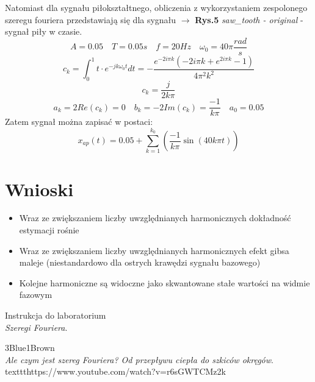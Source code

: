 \documentclass[13pt]{article}
\begin{document}
Natomiast dla sygnału piłokształtnego, obliczenia z wykorzystaniem zespolonego szeregu fouriera przedstawiają się dla sygnału $\rightarrow$ \textbf{Rys.5} \textit{saw\_tooth - original} - sygnał piły w czasie.
$$A=0.05 \quad T=0.05s \quad f=20Hz \quad \omega_0=40 \pi \frac{rad}{s}$$
$$c_k = \int_{0}^{1} t \cdot e^{-jk \omega_0 t}dt = - \frac{e^{-2i \pi k}(-2i \pi k + e^{2i \pi k} - 1)}{4 \pi^2 k^2}$$
$$c_k = \frac{j}{2k \pi}$$
$$a_k = 2Re(c_k)=0 \quad b_k = -2Im(c_k) = \frac{-1}{k \pi} \quad a_0 = 0.05$$
Zatem sygnał można zapisać w postaci:
$$x_{ap}(t) = 0.05 + \sum_{k=1}^{k_0}(\frac{-1}{k \pi} \sin(40k \pi t))$$

\section{Wnioski}
\begin{itemize}
\item Wraz ze zwiększaniem liczby uwzględnianych harmonicznych dokładność estymacji rośnie
\item Wraz ze zwiększaniem liczby uwzględnianych harmonicznych efekt gibsa maleje (niestandardowo dla ostrych krawędzi sygnału bazowego)
\item Kolejne harmoniczne są widoczne jako skwantowane stałe wartości na widmie fazowym
\end{itemize}
\begin{thebibliography}{9}
Instrukcja do laboratorium
\\\textit{Szeregi Fouriera}.

3Blue1Brown
\\\textit{Ale czym jest szereg Fouriera? Od przepływu ciepła do szkiców okręgów}.
\\texttt{https://www.youtube.com/watch?v=r6sGWTCMz2k} 
\end{thebibliography}
\end{document}
